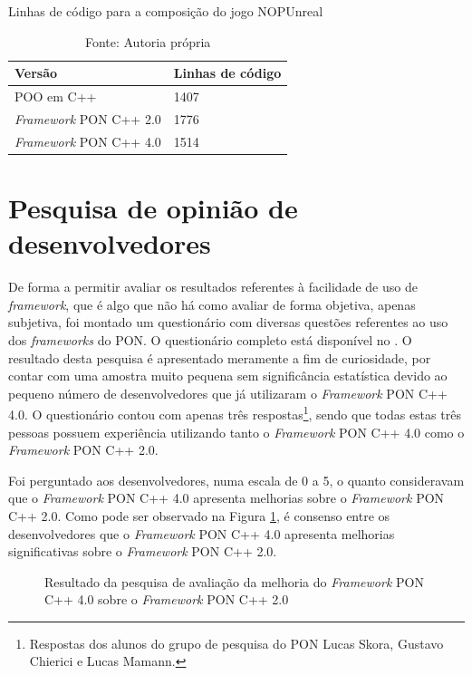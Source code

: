 \begin{table}[!htb]
\centering
\caption{Linhas de código para a composição do jogo NOPUnreal}
\smallskip
\begin{tabularx}{0.8\textwidth}{|X|X|}
\hline
Versão & Linhas de código\\
\hline
POO em C++ & 1407 \\
\hline
\textit{Framework} PON C++ 2.0 & 1776 \\
\hline
\textit{Framework} PON C++ 4.0 & 1514 \\
\hline
\end{tabularx}
\caption*{Fonte: Autoria própria}
\label{tab:linhas_de_codigo_nopunreal}
\end{table}

\section{Pesquisa de opinião de desenvolvedores}\label{sec:opiniao}

De forma a permitir avaliar os resultados referentes à facilidade de uso de
\textit{framework}, que é algo que não há como avaliar de forma objetiva, apenas
subjetiva, foi montado um questionário com diversas questões referentes ao uso
dos \textit{frameworks} do PON. O questionário completo está disponível no
. O resultado desta pesquisa é apresentado meramente a
fim de curiosidade, por contar com uma amostra muito pequena sem significância
estatística devido ao pequeno número de desenvolvedores que já utilizaram o
\textit{Framework} PON C++ 4.0. O questionário contou com apenas três
respostas\footnote{Respostas dos alunos do grupo de pesquisa do PON Lucas Skora,
Gustavo Chierici e Lucas Mamann.}, sendo que todas estas três pessoas possuem
experiência utilizando tanto o \textit{Framework} PON C++ 4.0 como o
\textit{Framework} PON C++ 2.0.

Foi perguntado aos desenvolvedores, numa escala de 0 a 5, o quanto consideravam
que o \textit{Framework} PON C++ 4.0 apresenta melhorias sobre o
\textit{Framework} PON C++ 2.0. Como pode ser observado na Figura
\ref{fig:fw_compare}, é consenso entre os desenvolvedores que o
\textit{Framework} PON C++ 4.0 apresenta melhorias significativas sobre o
\textit{Framework} PON C++ 2.0.

\begin{figure}[!htb]
\centering
{}
\caption{Resultado da pesquisa de avaliação da melhoria do \textit{Framework}
PON C++ 4.0 sobre o \textit{Framework} PON C++ 2.0}
\label{fig:fw_compare}
\end{figure}

